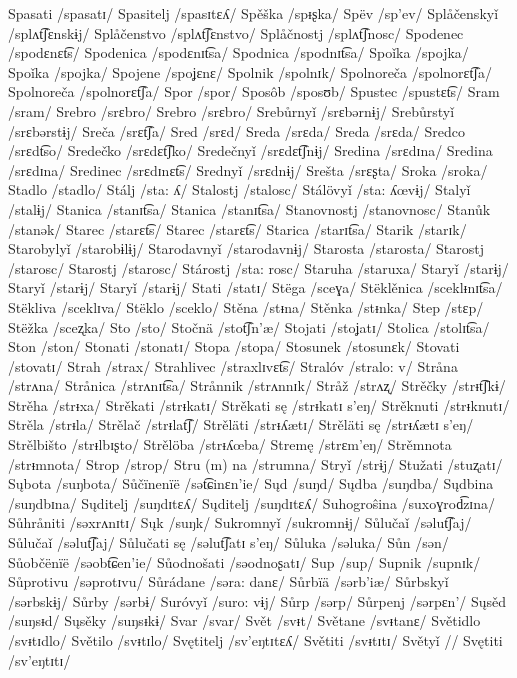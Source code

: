 Spasati /spasatɪ/
Spasitelj /spasɪtɛʎ/
Spěška /spᵻʂka/
Spëv /sp’ev/
Splåčenskyǐ /splʌt͡ʃɛnskɨj/
Splåčenstvo /splʌt͡ʃɛnstvo/
Splåčnostj /splʌt͡ʃnosc/
Spodenec /spodɛnɛt͡s/
Spodenica /spodɛnɪt͡sa/
Spodnica /spodnɪt͡sa/
Spoǐka /spojka/
Spoǐka /spojka/
Spojene /spoʝɛnɛ/
Spolnik /spolnɪk/
Spolnoreča /spolnorɛt͡ʃa/
Spolnoreča /spolnorɛt͡ʃa/
Spor /spor/
Sposôb /sposʊb/
Spustec /spustɛt͡s/
Sram /sram/
Srebro /srɛbro/
Srebro /srɛbro/
Srebůrnyǐ /srɛbərnɨj/
Srebůrstyǐ /srɛbərstɨj/
Sreča /srɛt͡ʃa/
Sred /srɛd/
Sreda /srɛda/
Sreda /srɛda/
Sredco /srɛdt͡so/
Sredečko /srɛdɛt͡ʃko/
Sredečnyǐ /srɛdɛt͡ʃnɨj/
Sredina /srɛdɪna/
Sredina /srɛdɪna/
Sredinec /srɛdɪnɛt͡s/
Srednyǐ /srɛdnɨj/
Srešta /srɛʂta/
Sroka /sroka/
Stadlo /stadlo/
Stálj /sta: ʎ/
Stalostj /stalosc/
Stálövyǐ /sta: ʎœvɨj/
Stalyǐ /stalɨj/
Stanica /stanɪt͡sa/
Stanica /stanɪt͡sa/
Stanovnostj /stanovnosc/
Stanůk /stanək/
Starec /starɛt͡s/
Starec /starɛt͡s/
Starica /starɪt͡sa/
Starik /starɪk/
Starobylyǐ /starobɨlɨj/
Starodavnyǐ /starodavnɨj/
Starosta /starosta/
Starostj /starosc/
Starostj /starosc/
Stárostj /sta: rosc/
Staruha /staruxa/
Staryǐ /starɨj/
Staryǐ /starɨj/
Staryǐ /starɨj/
Stati /statɪ/
Stëga /sceɣa/
Stëklěnica /sceklᵻnɪt͡sa/
Stëkliva /sceklɪva/
Stëklo /sceklo/
Stěna /stᵻna/
Stěnka /stᵻnka/
Step /stɛp/
Stëžka /sceʐka/
Sto /sto/
Stočnä /stot͡ʃn’æ/
Stojati /stoʝatɪ/
Stolica /stolɪt͡sa/
Ston /ston/
Stonati /stonatɪ/
Stopa /stopa/
Stosunek /stosunɛk/
Stovati /stovatɪ/
Strah /strax/
Strahlivec /straxlɪvɛt͡s/
Stralóv /stralo: v/
Stråna /strʌna/
Strånica /strʌnɪt͡sa/
Strånnik /strʌnnɪk/
Stråž /strʌʐ/
Strěčky /strᵻt͡ʃkɨ/
Strěha /strᵻxa/
Strěkati /strᵻkatɪ/
Strěkati sę /strᵻkatɪ s’eŋ/
Strěknuti /strᵻknutɪ/
Strěla /strᵻla/
Strělač /strᵻlat͡ʃ/
Strěläti /strᵻʎætɪ/
Strěläti sę /strᵻʎætɪ s’eŋ/
Strělbišto /strᵻlbɪʂto/
Strělöba /strᵻʎœba/
Stremę /strɛm’eŋ/
Strěmnota /strᵻmnota/
Strop /strop/
Stru (m) na /strumna/
Stryǐ /strɨj/
Stužati /stuʐatɪ/
Sųbota /suŋbota/
Sůčïnenïë /sət͡ɕinɛn’ie/
Sųd /suŋd/
Sųdba /suŋdba/
Sųdbina /suŋdbɪna/
Sųditelj /suŋdɪtɛʎ/
Sųditelj /suŋdɪtɛʎ/
Suhogroŝina /suxoɣrod͡zɪna/
Sůhråniti /səxrʌnɪtɪ/
Sųk /suŋk/
Sukromnyǐ /sukromnɨj/
Sůlučaǐ /səlut͡ʃaj/
Sůlučaǐ /səlut͡ʃaj/
Sůlučati sę /səlut͡ʃatɪ s’eŋ/
Sůluka /səluka/
Sůn /sən/
Sůobčënïë /səobt͡ɕen’ie/
Sůodnošati /səodnoʂatɪ/
Sup /sup/
Supnik /supnɪk/
Sůprotivu /səprotɪvu/
Sůrádane /səra: danɛ/
Sůrbïä /sərb’iæ/
Sůrbskyǐ /sərbskɨj/
Sůrby /sərbɨ/
Suróvyǐ /suro: vɨj/
Sůrp /sərp/
Sůrpenj /sərpɛn’/
Sųsěd /suŋsᵻd/
Sųsěky /suŋsᵻkɨ/
Svar /svar/
Svět /svᵻt/
Světane /svᵻtanɛ/
Světidlo /svᵻtɪdlo/
Světilo /svᵻtɪlo/
Svętitelj /sv’eŋtɪtɛʎ/
Světiti /svᵻtɪtɪ/
Světyǐ //
Svętiti /sv’eŋtɪtɪ/
